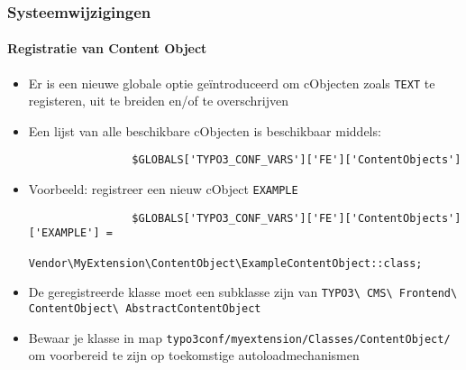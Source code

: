 
\begin{frame}[fragile]
	\frametitle{Systeemwijzigingen}
	\framesubtitle{Registratie van Content Object}

	\begin{itemize}

		\item Er is een nieuwe globale optie geïntroduceerd om cObjecten zoals \texttt{TEXT} 
			te registeren, uit te breiden en/of te overschrijven

		\item Een lijst van alle beschikbare cObjecten is beschikbaar middels:

			\begin{lstlisting}
				$GLOBALS['TYPO3_CONF_VARS']['FE']['ContentObjects']
			\end{lstlisting}

		\item Voorbeeld: registreer een nieuw cObject \texttt{EXAMPLE}

			\begin{lstlisting}
				$GLOBALS['TYPO3_CONF_VARS']['FE']['ContentObjects']['EXAMPLE'] =
				  Vendor\MyExtension\ContentObject\ExampleContentObject::class;
			\end{lstlisting}

		\item De geregistreerde klasse moet een subklasse zijn van
			\small
				\texttt{TYPO3\textbackslash
					CMS\textbackslash
					Frontend\textbackslash
					ContentObject\textbackslash
					AbstractContentObject}
			\normalsize

		\item Bewaar je klasse in map\newline
			\small
				\texttt{typo3conf/myextension/Classes/ContentObject/}
			\normalsize\newline
			om voorbereid te zijn op toekomstige autoloadmechanismen

	\end{itemize}

\end{frame}

